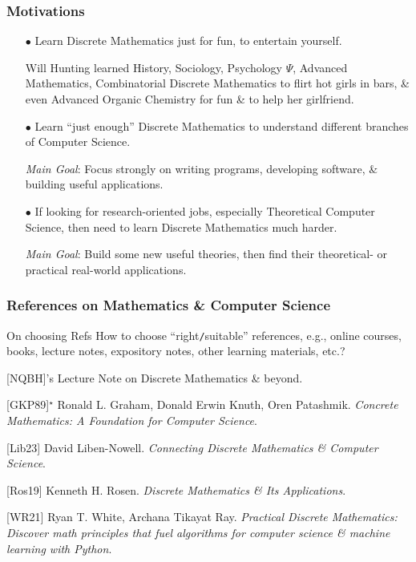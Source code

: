 \documentclass{beamer}
\begin{document}
\begin{frame}
	\frametitle{Motivations}
	\begin{itemize}
		\item[$\bullet$] Learn Discrete Mathematics just for fun, to entertain yourself.
		
		\begin{example}
			{\sc Will Hunting} learned History, Sociology, Psychology $\Psi$, Advanced Mathematics, Combinatorial Discrete Mathematics to flirt hot girls in bars, \& even Advanced Organic Chemistry for fun \& to help her girlfriend.
		\end{example}
		
		\item[$\bullet$] Learn ``just enough'' Discrete Mathematics to understand different branches of Computer Science.
		
		{\it Main Goal}: Focus strongly on writing programs, developing software, \& building useful applications.
		\item[$\bullet$] If looking for research-oriented jobs, especially Theoretical Computer Science, then need to learn Discrete Mathematics much harder.
		
		{\it Main Goal}: Build some new useful theories, then find their theoretical- or practical real-world applications.
	\end{itemize}
\end{frame}

\begin{frame}
	\frametitle{References on Mathematics \& Computer Science}
	\begin{block}{On choosing Refs}
		How to choose ``right{\tt/}suitable'' references, e.g., online courses, books, lecture notes, expository notes, other learning materials, etc.?
	\end{block}
		
	[NQBH]'s Lecture Note on Discrete Mathematics \& beyond.
	\vspace{2mm}
	
	[GKP89]${}^\star$ {\sc Ronald L. Graham, Donald Erwin Knuth, Oren Patashmik}. {\it Concrete Mathematics: A Foundation for Computer Science}.
	\vspace{2mm}
	
	[Lib23] {\sc David Liben-Nowell.} {\it Connecting Discrete Mathematics \& Computer Science}.
	\vspace{2mm}
	
	[Ros19] {\sc Kenneth H. Rosen}. {\it Discrete Mathematics \& Its Applications}.
	\vspace{2mm}
	
	[WR21] {\sc Ryan T. White, Archana Tikayat Ray}. {\it Practical Discrete Mathematics: Discover math principles that fuel algorithms for computer science \& machine learning with Python}.
\end{frame}
\end{document}

